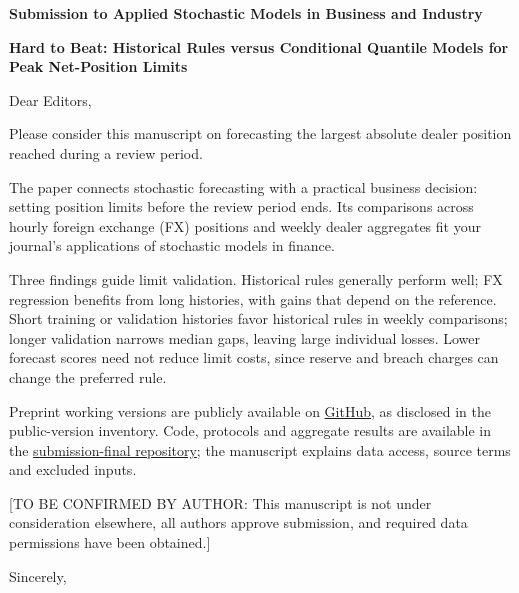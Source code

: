 \documentclass[12pt,a4paper]{article}
\begin{document}
\pagestyle{empty}
\setlength{\parindent}{0pt}
\setlength{\parskip}{10pt}
\textbf{Submission to Applied Stochastic Models in Business and Industry}\par
\textbf{Hard to Beat: Historical Rules versus Conditional Quantile Models for Peak Net-Position Limits}

Dear Editors,

Please consider this manuscript on forecasting the largest absolute dealer position reached during a review period.

The paper connects stochastic forecasting with a practical business decision: setting position limits before the review period ends. Its comparisons across hourly foreign exchange (FX) positions and weekly dealer aggregates fit your journal's applications of stochastic models in finance.

Three findings guide limit validation. Historical rules generally perform well; FX regression benefits from long histories, with gains that depend on the reference. Short training or validation histories favor historical rules in weekly comparisons; longer validation narrows median gaps, leaving large individual losses. Lower forecast scores need not reduce limit costs, since reserve and breach charges can change the preferred rule.

Preprint working versions are publicly available on \href{https://github.com/ByronLi0207/financial-mathematics-paper-20261020/blob/submission-final/notes/submission/public-versions.md}{GitHub}, as disclosed in the public-version inventory. Code, protocols and aggregate results are available in the \href{https://github.com/ByronLi0207/financial-mathematics-paper-20261020/tree/submission-final}{submission-final repository}; the manuscript explains data access, source terms and excluded inputs.

[TO BE CONFIRMED BY AUTHOR: This manuscript is not under consideration elsewhere, all authors approve submission, and required data permissions have been obtained.]

Sincerely,\par
[TO BE COMPLETED BY AUTHOR]
\end{document}
